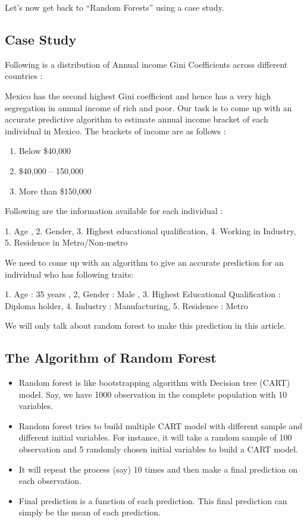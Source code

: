 Let’s now get back to “Random Forests” using a case study.


\subsection*{Case Study}
Following is a distribution of Annual income Gini Coefficients across different countries :


Mexico has the second highest Gini coefficient and hence has a very high segregation in annual income of rich and poor. Our task is to come up with an accurate predictive algorithm to estimate annual income bracket of each individual in Mexico. The brackets of income are as follows :

\begin{enumerate}
	\item Below \$40,000
	
	\item \$40,000 – 150,000
	
	\item More than \$150,000
\end{enumerate}


Following are the information available for each individual :

1. Age , 2. Gender,  3. Highest educational qualification, 4. Working in Industry, 5. Residence in Metro/Non-metro

We need to come up with an algorithm to give an accurate prediction for an individual who has following traits:

1. Age : 35 years , 2, Gender : Male , 3. Highest Educational Qualification : Diploma holder, 4. Industry : Manufacturing, 5. Residence : Metro

We will only talk about random forest to make this prediction in this article.




\subsection*{The Algorithm of Random Forest}

\begin{itemize}
	\item Random forest is like bootstrapping algorithm with Decision tree (CART) model. Say, we have 1000 observation in the complete population with 10 variables.
	\item  Random forest tries to build multiple CART model with different sample and different initial variables. For instance, it will take a random sample of 100 observation and 5 randomly chosen initial variables to build a CART model.
	\item It will repeat the process (say) 10 times and then make a final prediction on each observation. 
	\item Final prediction is a function of each prediction. This final prediction can simply be the mean of each prediction.
	 
\end{itemize}



